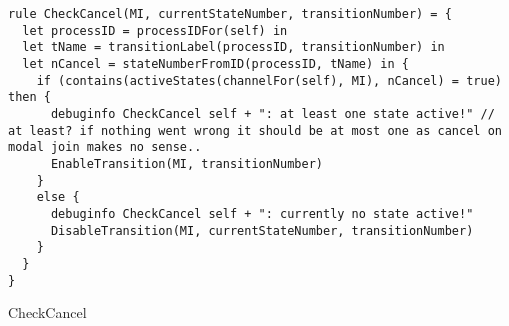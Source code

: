 \begin{listing}[H]
\begin{verbatim}
rule CheckCancel(MI, currentStateNumber, transitionNumber) = {
  let processID = processIDFor(self) in
  let tName = transitionLabel(processID, transitionNumber) in
  let nCancel = stateNumberFromID(processID, tName) in {
    if (contains(activeStates(channelFor(self), MI), nCancel) = true) then {
      debuginfo CheckCancel self + ": at least one state active!" // at least? if nothing went wrong it should be at most one as cancel on modal join makes no sense..
      EnableTransition(MI, transitionNumber)
    }
    else {
      debuginfo CheckCancel self + ": currently no state active!"
      DisableTransition(MI, currentStateNumber, transitionNumber)
    }
  }
}
\end{verbatim}
\caption{CheckCancel}
\label{lst:asm:CheckCancel}
\end{listing}




